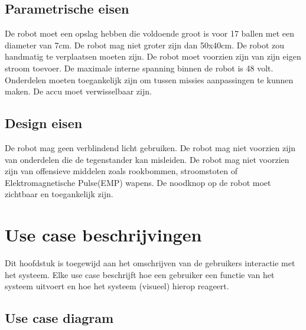 \documentclass[12pt]{article} %
\begin{document}
\subsection{Parametrische eisen}
\begin{enumerate}
 De robot moet een opslag hebben die voldoende groot is voor 17 ballen met een diameter van 7cm.
 De robot mag niet groter zijn dan 50x40cm.
 De robot zou handmatig te verplaatsen moeten zijn. 
 De robot moet voorzien zijn van zijn eigen stroom toevoer.
 De maximale interne spanning binnen de robot is 48 volt.
 Onderdelen moeten toegankelijk zijn om tussen missies aanpassingen te kunnen maken.
 De accu moet verwisselbaar zijn.
\end{enumerate}
\newpage

\subsection{Design eisen}
\begin{enumerate}
 De robot mag geen verblindend licht gebruiken.
 De robot mag niet voorzien zijn van onderdelen die de tegenstander kan misleiden.
 De robot mag niet voorzien zijn van offensieve middelen zoals rookbommen, stroomstoten of Elektromagnetische Pulse(EMP) wapens.
 De noodknop op de robot moet zichtbaar en toegankelijk zijn.
\end{enumerate}
\newpage

\section{Use case beschrijvingen}
Dit hoofdstuk is toegewijd aan het omschrijven van de gebruikers interactie met het systeem. Elke use case beschrijft hoe een gebruiker een functie van het systeem uitvoert en hoe het systeem (visueel) hierop reageert.

\subsection{Use case diagram}
\end{document}
